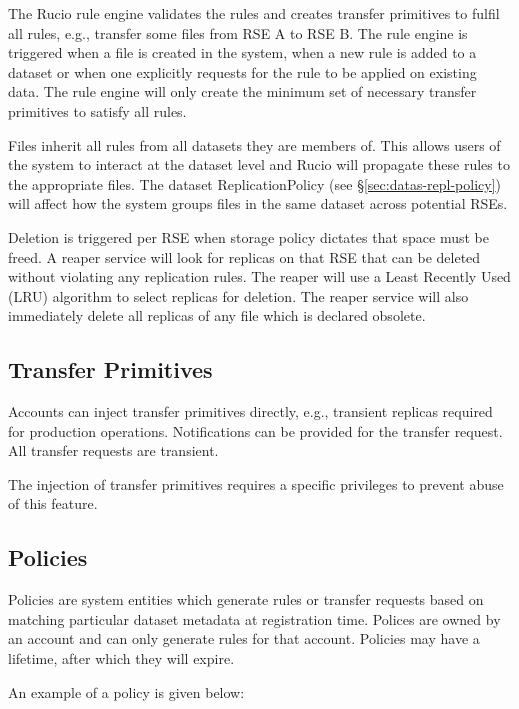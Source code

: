 \documentclass{atlasnote}
\begin{document}
The Rucio rule engine validates the rules and creates transfer
primitives to fulfil all rules, e.g., transfer some files from RSE A
to RSE B. The rule engine is triggered when a file is created in the
system, when a new rule is added to a dataset or when one explicitly
requests for the rule to be applied on existing data. The rule engine
will only create the minimum set of necessary transfer primitives to
satisfy all rules.

Files inherit all rules from all datasets they are members of. This
allows users of the system to interact at the dataset level and Rucio
will propagate these rules to the appropriate files. The dataset
ReplicationPolicy (see \S\ref{sec:datas-repl-policy}) will affect how
the system groups files in the same dataset across potential RSEs.

Deletion is triggered per RSE when storage policy dictates that space
must be freed. A reaper service will look for replicas on that RSE
that can be deleted without violating any replication rules. The
reaper will use a Least Recently Used (LRU) algorithm to select
replicas for deletion. The reaper service will also immediately delete
all replicas of any file which is declared obsolete.


\subsection{Transfer Primitives}
\label{sec:transfer-primitives}

Accounts can inject transfer primitives directly, e.g.,
transient replicas required for production operations. Notifications
can be provided for the transfer request. All transfer requests are
transient.

The injection of transfer primitives requires a specific privileges to
prevent abuse of this feature.

\subsection{Policies}
\label{sec:policies}

Policies are system entities which generate rules or transfer requests
based on matching particular dataset metadata at registration
time. Polices are owned by an account and can only generate rules for
that account. Policies may have a lifetime, after which they will
expire.

An example of a policy is given below:

\medskip
\end{document}

